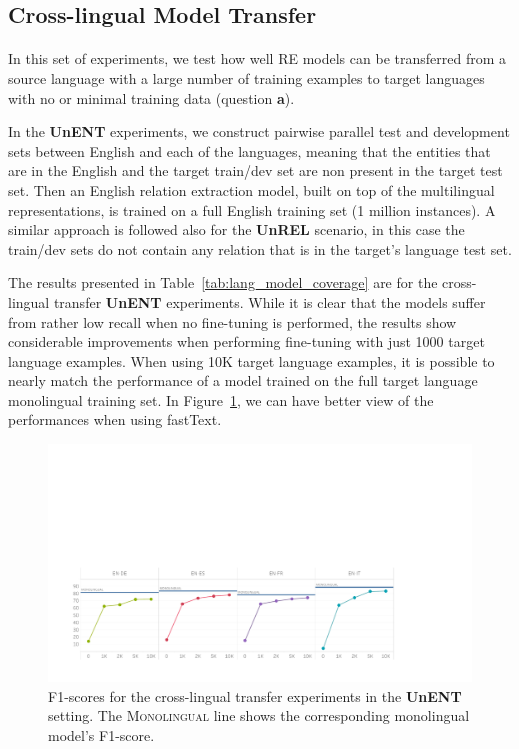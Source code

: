 \subsection{Cross-lingual Model Transfer}
\paragraph{}
In this set of experiments, we test how well RE models can be transferred from a source language with a large number of training examples to target languages with no or minimal training data (question \textbf{a}). 

In the \textbf{UnENT} experiments, we construct pairwise parallel test and development sets between English and each of the languages, meaning that the entities that are in the English and the target train/dev set are non present in the target test set. Then an English relation extraction model, built  on  top  of  the  multilingual representations, is trained on a full English training set (1 million instances). A similar approach is followed also for the \textbf{UnREL} scenario, in this case the train/dev sets do not contain any relation that is in the target's language test set.

The results presented in Table~\ref{tab:lang_model_coverage} are for the cross-lingual transfer \textbf{UnENT} experiments. While it is clear that the models suffer from rather low recall when no fine-tuning is performed,  the  results  show considerable  improvements when performing fine-tuning with just 1000 target language examples. When using 10K target language examples, it is possible to nearly match the performance of a model trained on the full target language monolingual training set. In Figure~\ref{fig:UnEntF1}, we can have better view of the performances when using fastText.

\begin{figure}[h!]
\centering
\includegraphics[width=\textwidth]{images/UnENT_color_fixed.pdf}
\caption{F1-scores for the cross-lingual transfer experiments in the \textbf{UnENT} setting. The \textsc{Monolingual} line shows the corresponding monolingual model's F1-score.}
\label{fig:UnEntF1}
\end{figure} 

